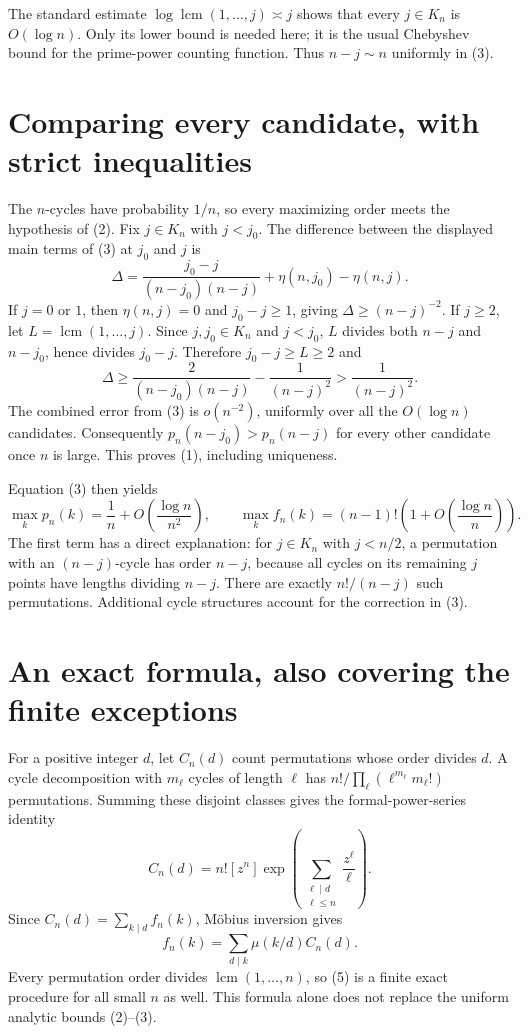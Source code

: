 \documentclass[11pt]{article}
\begin{document}
The standard estimate $\log\operatorname{lcm}(1,\ldots,j)\asymp j$ shows that every $j\in K_n$ is $O(\log n)$. Only its lower bound is needed here; it is the usual Chebyshev bound for the prime-power counting function. Thus $n-j\sim n$ uniformly in (3).

\section*{Comparing every candidate, with strict inequalities}
The $n$-cycles have probability $1/n$, so every maximizing order meets the hypothesis of (2). Fix $j\in K_n$ with $j<j_0$. The difference between the displayed main terms of (3) at $j_0$ and $j$ is
\[
 \Delta=\frac{j_0-j}{(n-j_0)(n-j)}+\eta(n,j_0)-\eta(n,j).\tag{4}
\]
If $j=0$ or $1$, then $\eta(n,j)=0$ and $j_0-j\ge1$, giving $\Delta\ge(n-j)^{-2}$. If $j\ge2$, let $L=\operatorname{lcm}(1,\ldots,j)$. Since $j,j_0\in K_n$ and $j<j_0$, $L$ divides both $n-j$ and $n-j_0$, hence divides $j_0-j$. Therefore $j_0-j\ge L\ge2$ and
\[
 \Delta\ge\frac2{(n-j_0)(n-j)}-\frac1{(n-j)^2}>
 \frac1{(n-j)^2}.
\]
The combined error from (3) is $o(n^{-2})$, uniformly over all the $O(\log n)$ candidates. Consequently $p_n(n-j_0)>p_n(n-j)$ for every other candidate once $n$ is large. This proves (1), including uniqueness.

Equation (3) then yields
\[
 \max_k p_n(k)=\frac1n+O\left(\frac{\log n}{n^2}\right),\qquad
 \max_k f_n(k)=(n-1)!\left(1+O\left(\frac{\log n}{n}\right)\right).
\]
The first term has a direct explanation: for $j\in K_n$ with $j<n/2$, a permutation with an $(n-j)$-cycle has order $n-j$, because all cycles on its remaining $j$ points have lengths dividing $n-j$. There are exactly $n!/(n-j)$ such permutations. Additional cycle structures account for the correction in (3).

\section*{An exact formula, also covering the finite exceptions}
For a positive integer $d$, let $C_n(d)$ count permutations whose order divides $d$. A cycle decomposition with $m_\ell$ cycles of length $\ell$ has $n!/\prod_\ell(\ell^{m_\ell}m_\ell!)$ permutations. Summing these disjoint classes gives the formal-power-series identity
\[
 C_n(d)=n![z^n]\exp\left(\sum_{\substack{\ell\mid d\\\ell\le n}}\frac{z^\ell}{\ell}\right).
\]
Since $C_n(d)=\sum_{k\mid d}f_n(k)$, M\"obius inversion gives
\[
 f_n(k)=\sum_{d\mid k}\mu(k/d)C_n(d).\tag{5}
\]
Every permutation order divides $\operatorname{lcm}(1,\ldots,n)$, so (5) is a finite exact procedure for all small $n$ as well. This formula alone does not replace the uniform analytic bounds (2)--(3).
\end{document}
